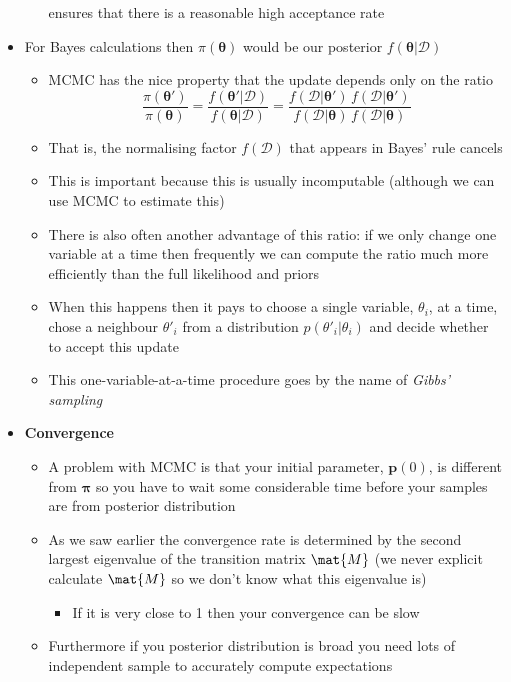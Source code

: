 \documentclass[11pt]{article}
\begin{document}
\begin{itemize}
\begin{itemize}
ensures that there is a reasonable high acceptance rate
\end{itemize}
\item For Bayes calculations then \(\pi(\bm{\theta})\) would be our
posterior \(f(\bm{\theta}|\mathcal{D})\)
\begin{itemize}
\item MCMC has the nice property that the update depends only on the
ratio
$$ \frac{\pi(\bm{\theta}')}{ \pi(\bm{\theta})} =
       \frac{f(\bm{\theta}'|\mathcal{D})}{f(\bm{\theta}|\mathcal{D})} 
       =
       \frac{f(\mathcal{D}|\bm{\theta}')\,f(\mathcal{D}|\bm{\theta}')}
       {f(\mathcal{D}|\bm{\theta})\,f(\mathcal{D}|\bm{\theta})} $$
\item That is, the normalising factor \(f(\mathcal{D})\) that appears
in Bayes' rule cancels
\item This is important because this is usually incomputable
(although we can use MCMC to estimate this)
\item There is also often another advantage of this ratio: if
we only change one variable at a time then frequently we can
compute the ratio much more efficiently than the full
likelihood and priors
\item When this happens then it pays to choose a single variable, \(\theta_{i}\), at a
time, chose a neighbour \(\theta'_{i}\) from a distribution
\(p(\theta'_{i}|\theta_{i})\) and decide whether to accept this update
\item This one-variable-at-a-time procedure goes by the name of
\emph{Gibbs' sampling}
\end{itemize}
\item \textbf{Convergence}
\begin{itemize}
\item A problem with MCMC is that your initial parameter, \(\bm{p}(0)\),
is different from \(\bm{\pi}\) so you have to wait
some considerable time before your samples are from posterior distribution
\item As we saw earlier the convergence rate is determined by the
second largest eigenvalue of the transition matrix \(\mat{M}\)
(we never explicit calculate \(\mat{M}\) so we don't know what
this eigenvalue is)
\begin{itemize}
\item If it is very close to 1 then your convergence can be slow
\end{itemize}
\item Furthermore if you posterior distribution is broad you need
lots of independent sample to accurately compute expectations

\end{itemize}
\end{itemize}
\end{document}
